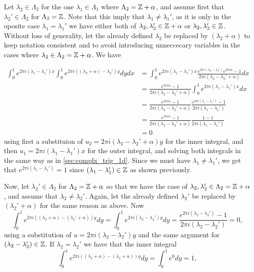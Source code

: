 \documentclass[../thesis.tex]{subfiles}
\begin{document}
Let $\lambda_2\in \Lambda_2$ for the one $\lambda_1\in\Lambda_1$ where $\Lambda_2=\mathbb{Z}+\alpha$, and assume first that $\lambda_2'\in \Lambda_2$ for $\Lambda_2 = \mathbb{Z}$. Note that this imply that $\lambda_1\neq\lambda_1'$, as it is only in the oposite case $\lambda_1 = \lambda_1'$ we have either both of $\lambda_2,\lambda_2' \in \mathbb{Z}+\alpha$ or $\lambda_2,\lambda_2' \in \mathbb{Z}$. Without loss of generality, let the already defined $\lambda_2$ be replaced by $(\lambda_2+\alpha)$ to keep notation consistent and to avoid introducing unneccecary variables in the cases where $\lambda_2 \in \Lambda_2 = \mathbb{Z}+\alpha$. We have

\begin{align*}
    \int_0^1e^{2\pi i  (\lambda_1- \lambda_1')x}\int_0^1  e^{2\pi i  ((\lambda_2+\alpha) - \lambda_2')y} dydx 
    &= \int_0^1e^{2\pi i  (\lambda_1- \lambda_1')x} \frac{e^{2\pi i (\lambda_2-\lambda_2')}e^{2\pi i \alpha}-1}{2\pi i (\lambda_2-\lambda_2'+\alpha)}dx\\ 
    &= \frac{e^{2\pi i \alpha}-1}{2\pi i (\lambda_2-\lambda_2'+\alpha)} \int_0^1e^{2\pi i  (\lambda_1- \lambda_1')x} dx\\ 
    &= \frac{e^{2\pi i \alpha}-1}{2\pi i (\lambda_2-\lambda_2'+\alpha)} \frac{e^{2\pi i (\lambda_1- \lambda_1')}-1}{2\pi i (\lambda_1- \lambda_1')}\\
    &= \frac{e^{2\pi i \alpha}-1}{2\pi i (\lambda_2-\lambda_2'+\alpha)} \frac{1-1}{2\pi i (\lambda_1- \lambda_1')}\\
    &= 0 
\end{align*}
using first a substituion of $u_2=2 \pi i (\lambda_2-\lambda_2'+\alpha)y$ for the inner integral, and then $u_1=2 \pi i (\lambda_1-\lambda_1')x$ for the outer integral, and solving both integrals in the same way as in \cref{sec:complx_trig_1d}. Since we must have $\lambda_1 \neq \lambda_1'$, we get that $e^{2\pi i (\lambda_1-\lambda_1')} = 1$ since $(\lambda_1-\lambda_1')\in \mathbb{Z}$ as shown previously. 


Now, let $\lambda_2'\in \Lambda_2$ for $\Lambda_2=\mathbb{Z}+\alpha$ so that we have the case of $\lambda_2,\lambda_2'\in \Lambda_2= \mathbb{Z}+\alpha$, and assume that $\lambda_2\neq\lambda_2'$. Again, let the already defined $\lambda_2'$ be replaced by $(\lambda_2'+\alpha)$ for the same reason as above. Now
\begin{equation*}
    \int_0^1  e^{2\pi i ((\lambda_2+\alpha) - (\lambda_2'+\alpha))y} dy = \int_0^1 e^{2\pi i  (\lambda_2 - \lambda_2')y} dy = \frac{e^{2\pi i (\lambda_2- \lambda_2')}-1}{2\pi i (\lambda_2- \lambda_2')} =0,
\end{equation*}
using a substitution of $u=2\pi i (\lambda_2-\lambda_2')y$ and the same argument for $(\lambda_2-\lambda_2') \in \mathbb{Z}$. If $\lambda_2 = \lambda_2'$ we have that the inner integral
\begin{equation*}
    \int_0^1  e^{2\pi i  ((\lambda_2+\alpha) - (\lambda_2+\alpha))y} dy =  \int_0^1 e^0 dy = 1,
\end{equation*}
\end{document}
